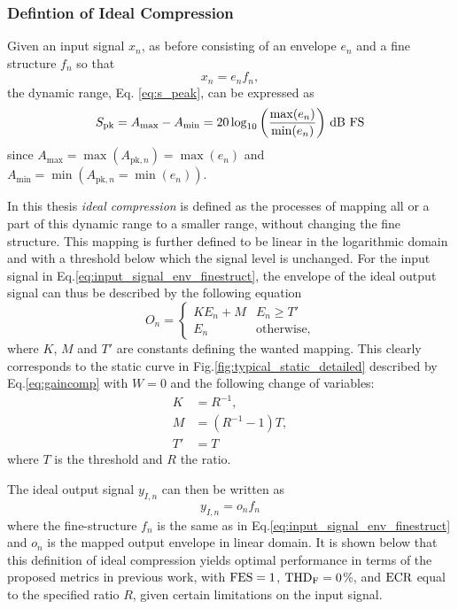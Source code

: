 \documentclass[../main2.tex]{subfiles}
\begin{document}
\subsubsection{Defintion of Ideal Compression}
\FloatBarrier
Given an input signal $x_n$, as before consisting of an envelope $e_n$ and a fine structure $f_n$ so that
\begin{equation}\label{eq:input_signal_env_finestruct}
x_n = e_n f_n,
\end{equation}
the dynamic range, Eq. \eqref{eq:s_peak}, can be expressed as
\begin{equation}
S_\text{pk} =A_\text{max} - A_\text{min} = 20 \log_{10} \left(\frac{\max(e_n)}{\min(e_n)}\right) \mskip3mu\text{dB~FS}
\end{equation}
since $A_\text{max} = \max(A_{\text{pk},n}) = \max(e_n)$ and $A_\text{min} =  \min(A_{\text{pk},n}=\min(e_n))$.
 
In this thesis \emph{ideal compression} is defined as the processes of mapping all or a part of this dynamic range to a smaller range, without changing the fine structure. This mapping is further defined to be linear in the logarithmic domain and with a threshold below which the signal level is unchanged. For the input signal in Eq.\eqref{eq:input_signal_env_finestruct}, the envelope of the ideal output signal can thus be described by the following equation
\begin{equation}\label{eq:dynamic_range_mapping}
O_n =
\begin{cases}
	K E_n + M 					& E_n \geq T'  \\
	E_n							& \text{otherwise},
\end{cases} 
\end{equation}\label{eq:ideal_output_envelope}
where $K$, $M$ and $T'$ are constants defining the wanted mapping. This clearly corresponds to the static curve in Fig.\ref{fig:typical_static_detailed} described by Eq.\eqref{eq:gaincomp} with $W=0$ and the following change of variables:
\begin{equation}
\begin{split}
K &= R^{-1}, \\
M &= (R^{-1}-1)T,\\
T' &= T
\end{split}
\end{equation}
where $T$ is the threshold and $R$ the ratio.

The ideal output signal $y_{I,n}$ can then be written as
\begin{equation}\label{eq:ideal_output}
y_{I,n} = o_n f_n
\end{equation}
where the fine-structure $f_n$ is the same as in Eq.\eqref{eq:input_signal_env_finestruct} and $o_n$ is the mapped output envelope in linear domain. It is shown below that this definition of ideal compression yields optimal performance in terms of the proposed metrics in previous work, with $\text{FES} = 1$, $\text{THD}_\text{F}=0$\%, and $\text{ECR}$ equal to the specified ratio $R$, given certain limitations on the input signal.
\end{document}
